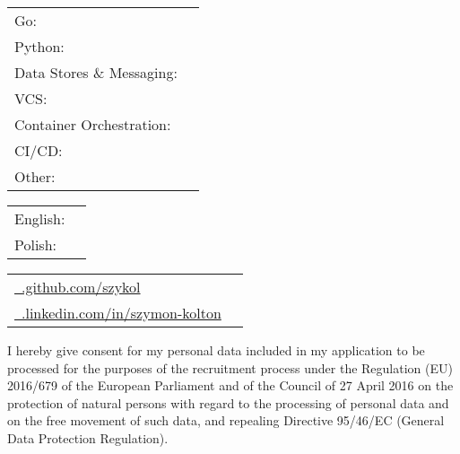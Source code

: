 \documentclass[]{awesome-cv}
\begin{document}
\vspace{-2mm}
\begin{cventries}
	\cventry
	{}
	{\def\arraystretch{1.15}{\begin{tabular}{ l l }
		Go: & {\skill{gomock, zap, dlv, freeconf, kafka-go, mongo-db-driver, msgpack, go-redis, go race}} \\
		Python:  & {\skill{ asyncio, fastapi, psycopg, asyncpg, aiohttp, flask, twisted, pytest }} \\
		Data Stores \& Messaging:  & {\skill{ postgresql, redis, mongodb, kafka }} \\
		VCS: & {\skill { git, github, gitlab, bitbucket, tfs }} \\
		Container Orchestration: & {\skill {kubernetes, helm, docker, docker-compose, docker-hub, k3s, harbor, k9s}} \\
		CI/CD: & {\skill {gitlab CI/CD, github actions, Jenkins}} \\
		Other: & {\skill {azure, jira, restconf, yang, gcp, rcp, scrum, hexagonal architecture, swagger, driver license}} \\
		\end{tabular}}}
	{}
	{}
	{}
\end{cventries}

\vspace{-7mm}

\begin{cventries}
	\cventry
	{}
	{\def\arraystretch{1.25}{\begin{tabular}{ l l }
		English:  & {\skill{ B2}} \\
		Polish:  & {\skill{ Native}} \\
		\end{tabular}}}
	{}
	{}
	{}
\end{cventries}
\vspace{-7mm}

\begin{cventries}
	\cventry
	{}
	{\def\arraystretch{1.25}{\begin{tabular}{ l l }
		\href{https://www.github.com/szykol}{\faGithubSquare\ \@www.github.com/szykol} \\
		\href{https://www.linkedin.com/in/szymon-kolton}{\faLinkedinSquare\ \@www.linkedin.com/in/szymon-kolton} \\
		\end{tabular}}}
	{}
	{}
	{}
\end{cventries}



\vspace{-5mm}
\begin{cventries}
	\cventry
	{}
	{}
	{}
	{}
	{I hereby give consent for my personal data included in my application to be processed for the purposes of the recruitment process under the Regulation (EU) 2016/679 of the European Parliament and of the Council of 27 April 2016 on the protection of natural persons with regard to the processing of personal data and on the free movement of such data, and repealing Directive 95/46/EC
	(General Data Protection Regulation).}
\end{cventries}
\end{document}
